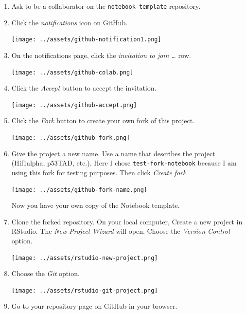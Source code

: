 \documentclass[
  letterpaper,
  DIV=11,
  numbers=noendperiod]{scrreprt}
\begin{document}
\begin{enumerate}
\def\labelenumi{\arabic{enumi}.}
\item
  Ask to be a collaborator on the \texttt{notebook-template} repository.
\item
  Click the \emph{notifications} icon on GitHub.

  \begin{center}
  \texttt{[image: ../assets/github-notification1.png]}
  \end{center}
\item
  On the notifications page, click the \emph{invitation to join
  \ldots{}} row.

  \begin{center}
  \texttt{[image: ../assets/github-colab.png]}
  \end{center}
\item
  Click the \emph{Accept} button to accept the invitation.

  \begin{center}
  \texttt{[image: ../assets/github-accept.png]}
  \end{center}
\item
  Click the \emph{Fork} button to create your own fork of this project.

  \begin{center}
  \texttt{[image: ../assets/github-fork.png]}
  \end{center}
\item
  Give the project a new name. Use a name that describes the project
  (Hif1alpha, p53TAD, etc.). Here I chose \texttt{test-fork-notebook}
  because I am using this fork for testing purposes. Then click
  \emph{Create fork}.

  \begin{center}
  \texttt{[image: ../assets/github-fork-name.png]}
  \end{center}

  Now you have your own copy of the Notebook template.
\item
  Clone the forked repository. On your local computer, Create a new
  project in RStudio. The \emph{New Project Wizard} will open. Choose
  the \emph{Version Control} option.

  \begin{center}
  \texttt{[image: ../assets/rstudio-new-project.png]}
  \end{center}
\item
  Choose the \emph{Git} option.

  \begin{center}
  \texttt{[image: ../assets/rstudio-git-project.png]}
  \end{center}
\item
  Go to your repository page on GitHub in your browser.


\end{enumerate}
\end{document}
